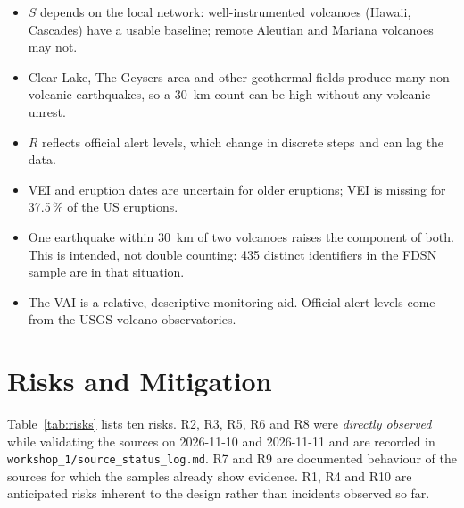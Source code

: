 \documentclass[11pt,a4paper]{article}
\begin{document}
\begin{itemize}
  \item $S$ depends on the local network: well-instrumented volcanoes (Hawaii,
  Cascades) have a usable baseline; remote Aleutian and Mariana volcanoes may not.
  \item Clear Lake, The Geysers area and other geothermal fields produce many
  non-volcanic earthquakes, so a 30~km count can be high without any volcanic unrest.
  \item $R$ reflects official alert levels, which change in discrete steps and can lag
  the data.
  \item VEI and eruption dates are uncertain for older eruptions; VEI is missing for
  37.5\,\% of the US eruptions.
  \item One earthquake within 30~km of two volcanoes raises the component of both.
  This is intended, not double counting: 435 distinct identifiers in the FDSN sample
  are in that situation.
  \item The VAI is a relative, descriptive monitoring aid. Official alert levels come
  from the USGS volcano observatories.
\end{itemize}

\section{Risks and Mitigation}
\label{sec:risks}

Table~\ref{tab:risks} lists ten risks. R2, R3, R5, R6 and R8 were \emph{directly
observed} while validating the sources on 2026-11-10 and 2026-11-11 and are recorded
in \texttt{workshop\_1/source\_status\_log.md}. R7 and R9 are documented behaviour of
the sources for which the samples already show evidence. R1, R4 and R10 are
anticipated risks inherent to the design rather than incidents observed so far.
\end{document}
